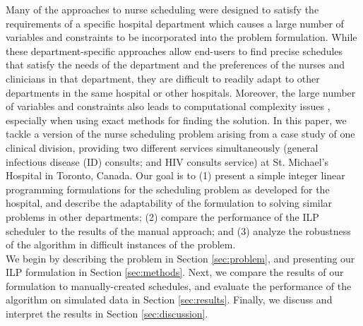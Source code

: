 
Many of the approaches to nurse scheduling were designed to satisfy the requirements of a specific hospital department which causes a large number of variables and constraints to be incorporated into the problem formulation. While these department-specific approaches allow end-users to find precise schedules that satisfy the needs of the department and the preferences of the nurses and clinicians in that department, they are difficult to readily adapt to other departments in the same hospital or other hospitals. %
Moreover, the large number of variables and constraints also leads to computational complexity issues \cite{goos_complexity_1996}, especially when using exact methods for finding the solution. In this paper, we tackle a version of the nurse scheduling problem arising from a case study of one clinical division, providing two different services simultaneously (general infectious disease (ID) consults; and HIV consults service) at St. Michael's Hospital in Toronto, Canada. Our goal is to (1) present a simple integer linear programming formulations for the scheduling problem as developed for the hospital, and describe the adaptability of the formulation to solving similar problems in other departments; (2) compare the performance of the ILP scheduler to the results of the manual approach; and (3) analyze the robustness of the algorithm in difficult instances of the problem. \\

We begin by describing the problem in Section \ref{sec:problem}, and presenting our ILP formulation in Section \ref{sec:methods}. Next, we compare the results of our formulation to manually-created schedules, and evaluate the performance of the algorithm on simulated data in Section \ref{sec:results}. Finally, we discuss and interpret the results in Section \ref{sec:discussion}. %